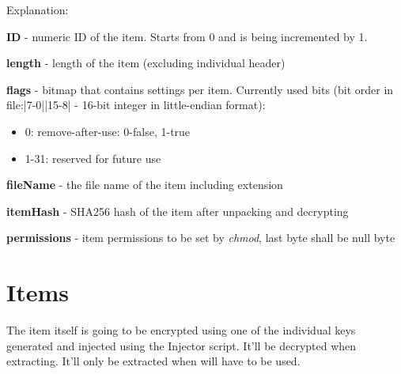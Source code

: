Explanation:

\textbf{ID} - numeric ID of the item. Starts from 0 and is being incremented by 1.

\textbf{length} - length of the item (excluding individual header)

\textbf{flags} - bitmap that contains settings per item. Currently used bits (bit order in file:|7-0||15-8| - 16-bit integer in little-endian format):
\begin{itemize}
  \item 0: remove-after-use: 0-false, 1-true
  \item 1-31: reserved for future use
\end{itemize}

\textbf{fileName} - the file name of the item including extension 

\textbf{itemHash} - SHA256 hash of the item after unpacking and decrypting

\textbf{permissions} - item permissions to be set by \emph{chmod}, last byte shall be null byte

\section{Items}
The item itself is going to be encrypted using one of the individual keys generated and injected using the Injector script. It'll be decrypted when extracting. It'll only be extracted when will have to be used.
